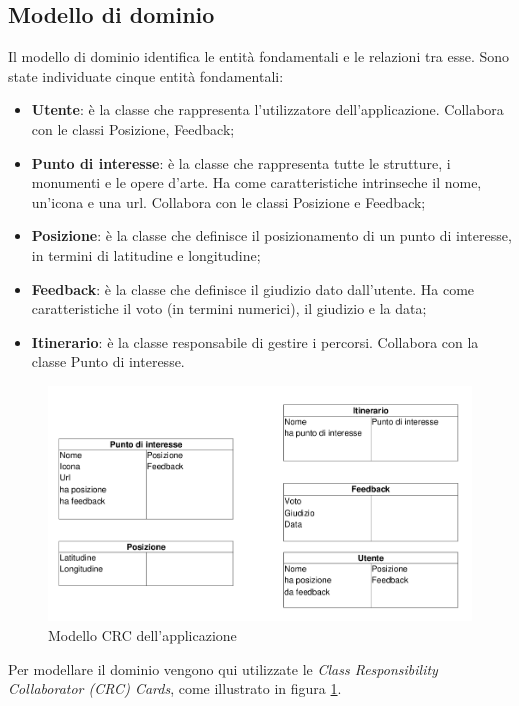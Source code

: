 \subsection{Modello di dominio}
Il modello di dominio identifica le entità fondamentali e le relazioni tra esse.
Sono state individuate cinque entità fondamentali:
\begin{itemize}
\item \textbf{Utente}: è la classe che rappresenta l'utilizzatore dell'applicazione. Collabora con le classi Posizione, Feedback;
\item \textbf{Punto di interesse}: è la classe che rappresenta tutte le strutture, i monumenti e le opere d'arte. Ha come caratteristiche intrinseche il nome, un'icona e una url. Collabora con le classi Posizione e Feedback;
\item \textbf{Posizione}: è la classe che definisce il posizionamento di un punto di interesse, in termini di latitudine e longitudine;
\item \textbf{Feedback}: è la classe che definisce il giudizio dato dall'utente. Ha come caratteristiche il voto (in termini numerici), il giudizio e la data;
\item \textbf{Itinerario}: è la classe responsabile di gestire i percorsi. Collabora con la classe Punto di interesse.
\end{itemize}
\begin{figure}
\begin{center}
\includegraphics[scale=0.50]{imgs/model/crcmodel.png}
\caption{Modello CRC dell'applicazione\label{crcmodel}}
\end{center}
\end{figure}
Per modellare il dominio vengono qui utilizzate le \textit{Class Responsibility Collaborator (CRC) Cards}, come illustrato in figura \ref{crcmodel}.

